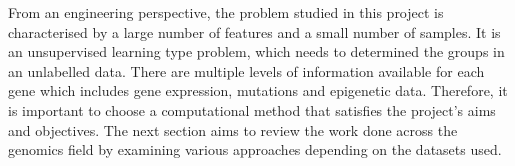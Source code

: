 From an engineering perspective, the problem studied in this project is characterised by a large number of features and a small number of samples. It is an unsupervised learning type problem, which needs to determined the groups in an unlabelled data. There are multiple levels of information available for each gene which includes gene expression, mutations and epigenetic data. Therefore, it is important to choose a computational method that satisfies the project's aims and objectives. The next section aims to review the work done across the genomics field by examining various approaches depending on the datasets used.
